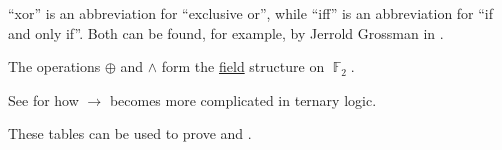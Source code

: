 \begin{comments}
  \item \enquote{xor} is an abbreviation for \enquote{exclusive or}, while \enquote{iff} is an abbreviation for \enquote{if and only if}. Both can be found, for example, by Jerrold Grossman in \cite[46]{Rosen1999}.

  \item The operations \( \oplus \) and \( \wedge \) form the \hyperref[def:field]{field} structure on \( \BbbF_2 \).

  \item See  for how \( {\rightarrow} \) becomes more complicated in ternary logic.

  \item These tables can be used to prove  and .
\end{comments}

